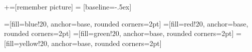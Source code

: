 \usepackage{tikz}
\usetikzlibrary{shadows.blur}
\usetikzlibrary{arrows,shapes,shapes.callouts,decorations.pathmorphing,backgrounds}
+=[remember picture]
 = [baseline=-.5ex]

=[fill=blue!20, anchor=base, rounded corners=2pt]
=[fill=red!20, anchor=base, rounded corners=2pt]
=[fill=green!20, anchor=base, rounded corners=2pt]
=[fill=yellow!20, anchor=base, rounded corners=2pt]

\newcommand{\CloudNote}[3]{
  \begin{tikzpicture}[overlay,remember picture, every text node part/.style={align=center}]
    \pgftransformshift{\pgfpointanchor{current page}{center}}
    \node[
    starburst,
    draw=black,
    ultra thick,
    fill=magenta,
    text width=#1,
    align=center,
    anchor=center,
    blur shadow={shadow blur steps=5}
    ] at (#2) {#3};
  \end{tikzpicture}
}
